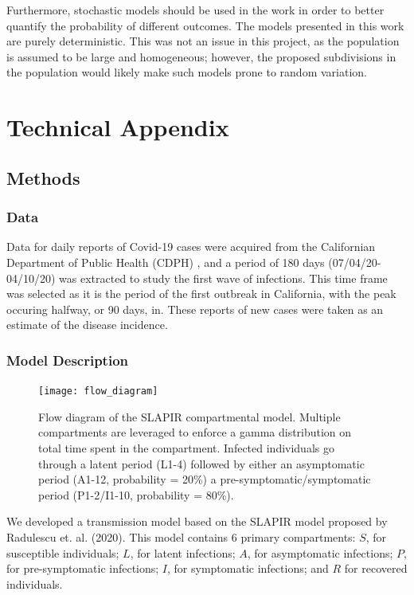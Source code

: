 \documentclass[11pt]{article}
\begin{document}
    Furthermore, stochastic models should be used in the work in order to better quantify the probability of different 
    outcomes.  The models presented in this work are purely deterministic. This was not an issue in this project, as the
    population is assumed to be large and homogeneous; however, the proposed subdivisions in the population would likely
    make such models prone to random variation.

\section{Technical Appendix}\label{appendix}

\subsection{Methods}
\subsubsection{Data}
    Data for daily reports of Covid-19 cases were acquired from the Californian Department of Public Health (CDPH)
    \cite{noauthor_covid-19_nodate}, and a period of 180 days (07/04/20-04/10/20) was extracted to study the first wave
    of infections. This time frame was selected as it is the period of the first outbreak in California, with the peak
    occuring halfway, or 90 days, in.  These reports of new cases were taken as an estimate of the disease incidence.

\subsubsection{Model Description}
    \begin{figure}
        \centering
        \texttt{[image: flow\_diagram]}
        \caption{Flow diagram of the SLAPIR compartmental model. Multiple compartments are leveraged to enforce a gamma 
        distribution on total time spent in the compartment.  Infected individuals go through a latent period (L1-4) followed by
        either an asymptomatic period (A1-12, probability = 20\%) a pre-symptomatic/symptomatic period (P1-2/I1-10, probability = 80\%).}
        \label{flow_diagram}
    \end{figure}
    We developed a transmission model based on the SLAPIR model proposed by Radulescu et. al. (2020)\cite{radulescu_management_2020}. This model contains 6 primary compartments: $S$, for susceptible individuals; $L$, for latent infections; $A$, for 
    asymptomatic infections; $P$, for pre-symptomatic infections; $I$, for symptomatic infections; and $R$ for recovered 
    individuals. 
\end{document}
